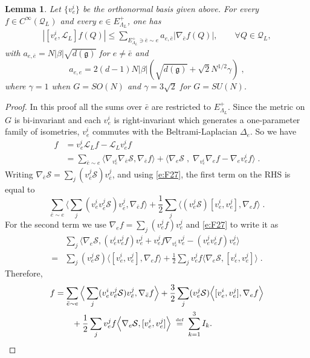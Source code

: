 \documentclass[11pt,UTF-8,reqno]{amsart}
\numberwithin{equation}{section}
\newtheorem{lemma}[theorem]{Lemma}
\def\<{{\langle}}
\def\>{{\rangle}}
\def\={&\!\!=\!\!&}
\newcommand{\eqdef}{\stackrel{\mbox{\tiny def}}{=}}
\def\cL{{\mathcal L}}
\def\cQ{{\mathcal Q}}
\def\cS{{\mathcal S}}
\def\leq{\leqslant}
\def\<{{\langle}}
\def\>{{\rangle}}
\def\={&\!\!=\!\!&}
\def\bl{\begin{lemma}}
\def\el{\end{lemma}}
\def\mfg{\mathfrak{g}}
\def\leq{\leqslant}
\def\dg{d(\mfg)}
\def\<{\langle} \def\>{\rangle}
\begin{document}
\bl\label{lem:zmm} 
Let  $\{v_e^i\}$ be the orthonormal basis given above.
For every $f\in  C^\infty(\cQ_L)$ and every $e\in E^+_{\Lambda_{L}}$,
one has
\begin{align*}
	|[v_e^i,\cL_L]f(Q)|  \leq \sum_{E_{\Lambda_L}^+\ni\bar e\sim e} a_{e,\bar e} |\nabla_{\bar e}f(Q)|,\qquad \forall Q\in \cQ_L,
\end{align*}
with $a_{e,\bar e}= N|\beta| \sqrt{\dg}$ for $e\neq \bar e$ and
$$
a_{e, e}= 2(d-1)N|\beta| (\sqrt{\dg}+\sqrt2N^{1/2}\gamma)\;,
$$
where $\gamma=1$ when $G=SO(N)$ and $\gamma=3\sqrt2$ for $G=SU(N)$.
\el
\begin{proof}
In this proof all the sums over $\bar e$ are restricted to $E_{\Lambda_L}^+$.
	Since the metric on $G$ is bi-invariant and each $v_e^i$ is right-invariant which generates a one-parameter family of isometries,
	$v_e^i$ commutes with the Beltrami-Laplacian $\Delta_e$. So we have
	\begin{align*}
		[v_e^i,\cL_L]f
		&=v_e^i \cL_L f-\cL_L v_e^i f
		\\
		&=\sum_{\bar e\sim e}  \big\<\nabla_{v_e^i} \nabla_{\bar e}\cS,\nabla_{\bar e} f \big\>
		+\big \<\nabla_e\cS \;, \; \nabla_{v_e^i}\nabla_{e}f-\nabla_{e}v_e^if \big\> \;.
	\end{align*}
Writing $\nabla_{\bar e}\cS = \sum_j(v_{\bar e}^j \cS) v_{\bar e}^j$, and  using \eqref{e:F27}, the first term on the RHS is equal to	
$$
\sum_{\bar e\sim e} \Big\<\sum_j (v_e^iv_{\bar e}^j\cS)  v_{\bar e}^j,\nabla_{\bar e} f \Big\>
		+\frac12\sum_j \Big\< (v_e^j\cS) [v_e^i,v_e^j],\nabla_{ e}f \Big\>\;.
$$		
For the second term we use $\nabla_{ e}f = \sum_j(v_{ e}^j f) v_{ e}^j$ and \eqref{e:F27} to write it as
\begin{align*}
&\sum_j\Big\<\nabla_e\cS,(v_e^iv_e^jf)v_e^j+v_e^jf\nabla_{v_e^i}v_e^j-(v_e^jv_e^if)v_e^j\Big\>
\\=&\sum_j (v_e^j\cS) \Big\<[v_e^i,v_e^j],\nabla_{ e}f \Big\>+\frac12 \sum_j v_e^j f \Big\<\nabla_e\cS,[v_e^i,v_e^j] \Big\>\;.
\end{align*}
Therefore,
	\begin{align*}
		[v_e^i,\cL_L]f
		&=\sum_{\bar e\sim e}
		\Big\<\sum_j (v_e^iv_{\bar e}^j\cS)  v_{\bar e}^j,\nabla_{\bar e} f \Big\>
		+\frac32\sum_j (v_e^j\cS) \Big\<[v_e^i,v_e^j],\nabla_{ e}f \Big\>
		\\
		& \qquad +\frac12 \sum_j v_e^j f \Big\<\nabla_e\cS,[v_e^i,v_e^j] \Big\>
		\; \eqdef  \; \sum_{k=1}^3I_k.
	\end{align*}
	

\end{proof}
\end{document}
